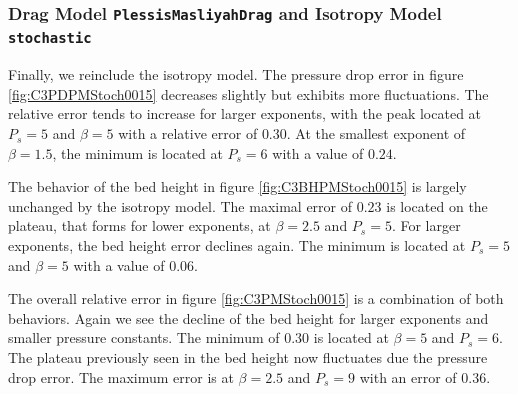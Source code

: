 

\subsubsection{Drag Model \lstinline|PlessisMasliyahDrag| and Isotropy Model \lstinline|stochastic|}

Finally, we reinclude the isotropy model.
The pressure drop error in figure \ref{fig:C3PDPMStoch0015} decreases slightly but exhibits more fluctuations.
The relative error tends to increase for larger exponents, with the peak located at $P_s = 5$ and $\beta = 5$ with a relative error of $0.30$.
At the smallest exponent of $\beta = 1.5$, the minimum is located at $P_s = 6$ with a value of $0.24$.

The behavior of the bed height in figure \ref{fig:C3BHPMStoch0015} is largely unchanged by the isotropy model.
The maximal error of $0.23$ is located on the plateau, that forms for lower exponents, at $\beta = 2.5$ and $P_s = 5$.
For larger exponents, the bed height error declines again. The minimum is located at $P_s =5$ and $\beta = 5$ with a value of $0.06$.

The overall relative error in figure \ref{fig:C3PMStoch0015} is a combination of both behaviors. Again we see the decline of the bed height for larger exponents and smaller pressure constants. The minimum of $0.30$ is located at $\beta = 5$ and $P_s = 6$.
The plateau previously seen in the bed height now fluctuates due the pressure drop error. The maximum error is at $\beta = 2.5$ and $P_s = 9$ with an error of $0.36$.

